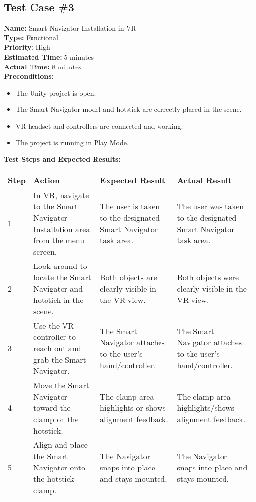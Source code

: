 \documentclass[11pt]{article}
\begin{document}
\subsection{Test Case \#3}
\textbf{Name:} Smart Navigator Installation in VR \\
\textbf{Type:} Functional \\
\textbf{Priority:} High \\
\textbf{Estimated Time:} 5 minutes \\
\textbf{Actual Time:} 8 minutes \\
\textbf{Preconditions:} 
\begin{itemize}
\item The Unity project is open.
\item The Smart Navigator model and hotstick are correctly placed in the scene.
\item VR headset and controllers are connected and working.
\item The project is running in Play Mode.
\end{itemize}
\textbf{Test Steps and Expected Results:} \\
\begin{tabular}{@{} p{0.8cm} p{4.6cm} p{4.6cm} p{4.6cm} @{}}
\toprule
\textbf{Step} & \textbf{Action} & \textbf{Expected Result} & \textbf{Actual Result} \\
\midrule
1 & In VR, navigate to the Smart Navigator Installation area from the menu screen. & The user is taken to the designated Smart Navigator task area. & The user was taken to the designated Smart Navigator task area. \\
2 & Look around to locate the Smart Navigator and hotstick in the scene. & Both objects are clearly visible in the VR view. & Both objects were clearly visible in the VR view. \\
3 & Use the VR controller to reach out and grab the Smart Navigator. & The Smart Navigator attaches to the user's hand/controller. & The Smart Navigator attaches to the user's hand/controller. \\
4 & Move the Smart Navigator toward the clamp on the hotstick. & The clamp area highlights or shows alignment feedback. & The clamp area highlights/shows alignment feedback. \\
5 & Align and place the Smart Navigator onto the hotstick clamp. & The Navigator snaps into place and stays mounted. & The Navigator snaps into place and stays mounted. \\
\bottomrule
\end{tabular}
\end{document}
